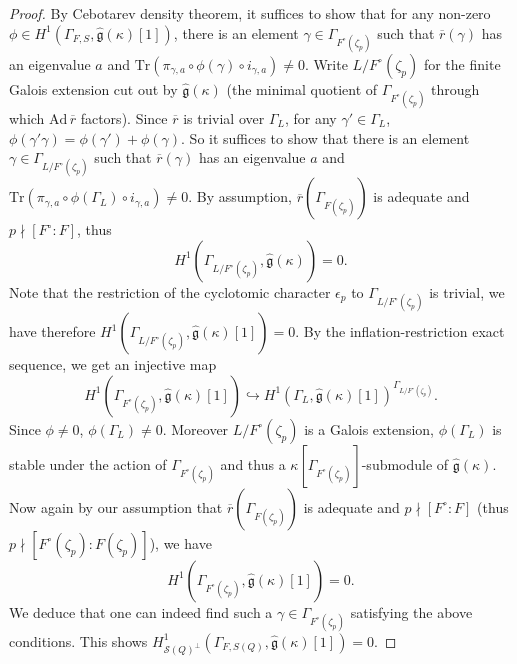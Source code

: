\documentclass[12pt,oneside,reqno]{amsart}
\theoremstyle{plain}
\begin{document}
\begin{proof}
		By Cebotarev density theorem,
		it suffices to show that
		for any non-zero
		$\phi\in
		H^1(\Gamma_{F,S},
		\widehat{\mathfrak{g}}(\kappa)[1])$,
		there is an element
		$\gamma\in
		\Gamma_{F^\circ(\zeta_p)}$
		such that
		$\overline{r}(\gamma)$
		has an eigenvalue $a$
		and
		$
		\mathrm{Tr}
		\left(
		\pi_{\gamma,a}
		\circ
		\phi(\gamma)
		\circ
		i_{\gamma,a}
		\right)
		\neq0$.
		Write
		$L/F^\circ(\zeta_p)$
		for the finite  Galois extension
		cut out by
		$\widehat{\mathfrak{g}}(\kappa)$
		(the minimal quotient of
		$\Gamma_{F^\circ(\zeta_p)}$ through which
		$\mathrm{Ad}\,\overline{r}$
		factors).
		Since
		$\overline{r}$
		is trivial over
		$\Gamma_L$,
		for any $\gamma'\in\Gamma_L$,
		$\phi(\gamma'\gamma)
		=
		\phi(\gamma')+\phi(\gamma)
		$.
		So it suffices to show that
		there is an element
		$\gamma\in
		\Gamma_{L/F^\circ(\zeta_p)}$
		such that
		$\overline{r}(\gamma)$
		has an eigenvalue $a$
		and
		$\mathrm{Tr}
		\left(
		\pi_{\gamma,a}
		\circ
		\phi(\Gamma_L)
		\circ
		i_{\gamma,a}
		\right)
		\neq0$.
		By assumption,
		$\overline{r}(\Gamma_{F(\zeta_p)})$
		is adequate and $p\nmid[F^\circ:F]$,
		thus
		\[
		H^1
		(\Gamma_{L/F^\circ(\zeta_p)},
		\widehat{\mathfrak{g}}(\kappa))
		=0.
		\]
		Note that the restriction of the cyclotomic character
		$\epsilon_p$
		to
		$\Gamma_{L/F^\circ(\zeta_p)}$
		is trivial,
		we have therefore
		$H^1
		(\Gamma_{L/F^\circ(\zeta_p)},
		\widehat{\mathfrak{g}}(\kappa)[1])
		=0$.
		By the
		inflation-restriction exact sequence,
		we get an injective map
		\[
		H^1
		(\Gamma_{F^\circ(\zeta_p)},
		\widehat{\mathfrak{g}}(\kappa)[1])
		\hookrightarrow
		H^1(\Gamma_L,
		\widehat{\mathfrak{g}}(\kappa)[1])^{\Gamma_{L/F^\circ(\zeta_p)}}.
		\]
		Since
		$\phi\neq0$, $\phi(\Gamma_L)\neq0$.	Moreover $L/F^\circ(\zeta_p)$	is a Galois extension,
		$\phi(\Gamma_L)$
		is stable under the action of
		$\Gamma_{F^\circ(\zeta_p)}$
		and thus a
		$\kappa[\Gamma_{F^\circ(\zeta_p)}]$-submodule of
		$\widehat{\mathfrak{g}}(\kappa)$.
		Now again by our assumption that
		$\overline{r}(\Gamma_{F(\zeta_p)})$
		is adequate and $p\nmid[F^\circ:F]$ (thus $p\nmid[F^\circ(\zeta_p):F(\zeta_p)]$), we have
		\[
		H^1(\Gamma_{F^\circ(\zeta_p)},\widehat{\mathfrak{g}}(\kappa)[1])=0.
		\]
		We deduce that one can indeed find such a
		$\gamma\in\Gamma_{F^\circ(\zeta_p)}$
		satisfying the above conditions.
		This shows
		$H^1_{\mathcal{S}(Q)^\perp}
		(\Gamma_{F,S(Q)},
		\widehat{\mathfrak{g}}(\kappa)[1])=0$.
		
		
	\end{proof}
	
\end{document}
